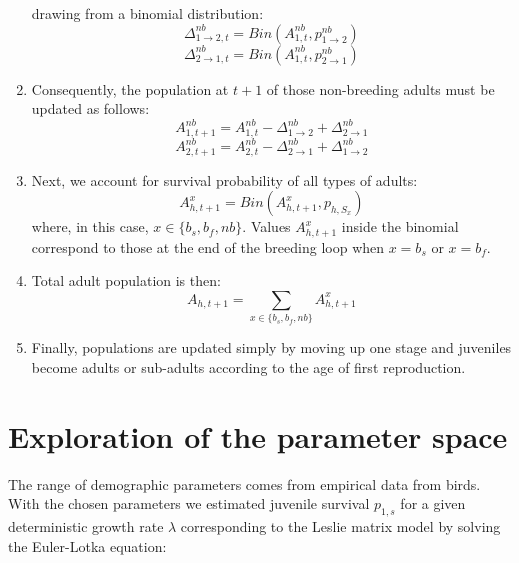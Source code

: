 \begin{enumerate}
drawing from a binomial distribution:
    \begin{equation*}
{\Delta}_{1\rightarrow2,t}^{nb} = Bin \left({A}_{1,t}^{nb},
{p}_{1\rightarrow2}^{nb} \right)
    \end{equation*}
    \begin{equation*}
{\Delta}_{2\rightarrow1,t}^{nb} = Bin \left({A}_{1,t}^{nb},
{p}_{2\rightarrow1}^{nb} \right)
    \end{equation*}
  \item Consequently, the population at $t+1$ of those non-breeding adults must 
be updated as follows:
    \begin{equation*}
{A}_{1,t+1}^{nb} = {A}_{1,t}^{nb} - {\Delta}_{1\rightarrow2}^{nb} +
{\Delta}_{2\rightarrow1}^{nb}
    \end{equation*}
    \begin{equation*}
{A}_{2,t+1}^{nb} = {A}_{2,t}^{nb} - {\Delta}_{2\rightarrow1}^{nb} +
{\Delta}_{1\rightarrow2}^{nb}
    \end{equation*}
  \item Next, we account for survival probability of all types of adults:
    \begin{equation*}
{A}_{h,t+1}^{x} =Bin \left({A}_{h,t+1}^{x} , {p}_{h, {S}_{x}} \right)
    \end{equation*}
  where, in this case, $x \in \{ {b}_{s}, {b}_{f}, nb \}$. Values
${A}_{h,t+1}^{x}$ inside the binomial correspond to those at the end of the
breeding loop when $x=b_{s}$ or $x=b_{f}$.
  \item Total adult population is then:
    \begin{equation*}
{A}_{h,t+1} = \sum_{x \in \{ {b}_{s}, {b}_{f}, nb \}} {{A}_{h,t+1}^{x}}
    \end{equation*}
  \item Finally, populations are updated simply by moving up one stage and 
juveniles become adults or sub-adults according to the age of first 
reproduction.
\end{enumerate}


\section*{Exploration of the parameter space}\label{model-exploration}

The range of demographic parameters comes from empirical data from birds. With 
the chosen parameters we estimated juvenile survival $p_{1,s}$ for a given 
deterministic growth rate $\lambda$ corresponding to the Leslie matrix model by
solving the Euler-Lotka equation:

